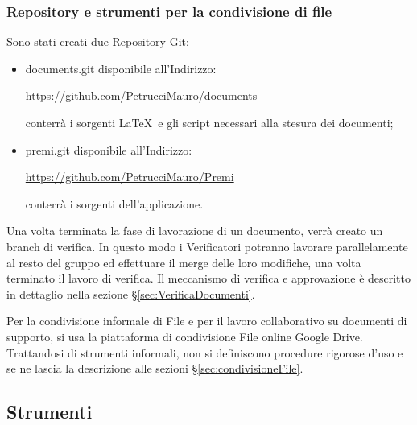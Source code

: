 \subsubsection{Repository e strumenti per la condivisione di file}

Sono stati creati due Repository Git:
\begin{itemize}


\item documents.git disponibile all’Indirizzo:\\
\begin{center}\url{https://github.com/PetrucciMauro/documents}\\\end{center}
conterrà i sorgenti \LaTeX \ e gli script necessari alla stesura dei documenti;
\item premi.git disponibile all’Indirizzo:\\
\begin{center}
\url{https://github.com/PetrucciMauro/Premi}\\
\end{center}
conterrà i sorgenti dell’applicazione.\\
\end{itemize}
Una volta terminata la fase di lavorazione di un documento, verrà creato un branch di verifica. In questo modo i Verificatori potranno lavorare parallelamente al resto del gruppo ed effettuare il merge  delle loro modifiche, una volta terminato il lavoro di verifica.
Il meccanismo di verifica e approvazione è descritto in dettaglio nella sezione \S\ref{sec:VerificaDocumenti}.


Per la condivisione informale di File e per il lavoro collaborativo su documenti di supporto, si usa la piattaforma di condivisione File online Google Drive.
Trattandosi di strumenti informali, non si definiscono procedure rigorose d’uso e se ne lascia la descrizione alle sezioni \S\ref{sec:condivisioneFile}.


\subsection{Strumenti}


